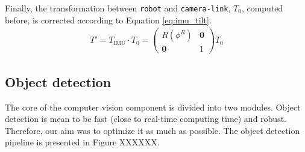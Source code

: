 Finally, the transformation between \texttt{robot} and \texttt{camera-link}, $T_0$, computed before, is corrected according to Equation \ref{eq:imu_tilt}.
\begin{align}
\label{eq:imu_tilt}
T' = T_{\text{IMU}} \cdot T_0 = 
\begin{pmatrix}
R(\phi^R) & \textbf{0}\\
\textbf{0} & 1 
\end{pmatrix} T_0
\end{align}

\subsection{Object detection}
The core of the computer vision component is divided into two modules. Object detection is mean to be fast (close to real-time computing time) and robust. Therefore, our aim was to optimize it as much as possible. The object detection pipeline is presented in Figure XXXXXX.


